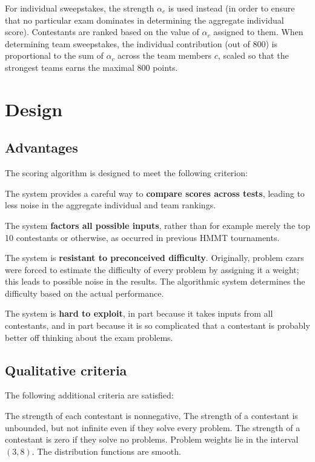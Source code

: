 For individual sweepstakes, the strength $\alpha_c$ is used instead
(in order to ensure that no particular exam dominates
in determining the aggregate individual score).
Contestants are ranked based on the value of $\alpha_c$ assigned to them.
When determining team sweepstakes,
the individual contribution (out of $800$)
is proportional to the sum of $\alpha_c$ across the team members $c$,
scaled so that the strongest teams earns the maximal $800$ points.

\section{Design}
\subsection{Advantages}
The scoring algorithm is designed to meet the following criterion:
\begin{itemize}
	\ii The system provides a careful way to
	\textbf{compare scores across tests},
	leading to less noise in the aggregate individual
	and team rankings.

	\ii The system \textbf{factors all possible inputs},
	rather than for example merely the top 10 contestants or otherwise,
	as occurred in previous HMMT tournaments.

	\ii The system is \textbf{resistant to preconceived difficulty}.
	Originally, problem czars were forced to estimate the difficulty
	of every problem by assigning it a weight;
	this leads to possible noise in the results.
	The algorithmic system determines the difficulty based on the actual performance.

	\ii The system is \textbf{hard to exploit},
	in part because it takes inputs from all contestants,
	and in part because it is so complicated
	that a contestant is probably better off thinking about
	the exam problems.
\end{itemize}

\subsection{Qualitative criteria}
The following additional criteria are satisfied:
\begin{itemize}
	\ii The strength of each contestant is nonnegative,
	\ii The strength of a contestant is unbounded,
	but not infinite even if they solve every problem.
	\ii The strength of a contestant is zero
	if they solve no problems.
	\ii Problem weights lie in the interval $(3,8)$.
	\ii The distribution functions are smooth.
\end{itemize}

